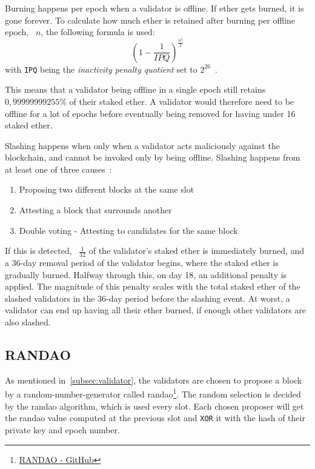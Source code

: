 Burning happens per epoch when a validator is offline.
If ether gets burned, it is gone forever.
To calculate how much ether is retained after burning per offline epoch, ~$n$, the following formula is used:
\begin{equation}
    \left(1-\frac{1}{IPQ}\right)^\frac{n^2}{2}
    \label{eq:burn}
\end{equation}
with \texttt{IPQ} being the \textit{inactivity penalty quotient} set to $2^{26}$~\cite{consensus-spec-phase-0}.


This means that a validator being offline in a single epoch still retains $0,99999999255\%$ of their staked ether\@.
A validator would therefore need
to be offline for a lot of epochs before eventually being removed for having under 16 staked ether\@.


Slashing happens when only when a validator acts maliciously against the blockchain,
and cannot be invoked only by being offline.
Slashing happens from at least one of three causes~\cite{PoSRewAndPen}:
\begin{enumerate}
    \item Proposing two different blocks at the same slot
    \item Attesting a block that surrounds another
    \item Double voting - Attesting to candidates for the same block
\end{enumerate}
If this is detected, ~$\frac{1}{32}$ of the validator's staked ether is immediately burned,
and a 36-day removal period of the validator begins, where the staked ether is gradually burned.
Halfway through this, on day 18, an additional penalty is applied.
The magnitude of this penalty scales with the total staked ether of the slashed validators in the 36-day period before the slashing event.
At worst, a validator can end up having all their ether burned, if enough other validators are also slashed.

\subsection{RANDAO}\label{subsec:randao}
As mentioned in~\autoref{subsec:validator}, the validators are chosen to propose a block by a random-number-generator called \gls{randao}\footnote{\href{https://github.com/randao/randao}{RANDAO - GitHub}}.
The random selection is decided by the \gls{randao} algorithm, which is used every slot.
Each chosen proposer will get the \gls{randao} value computed at the previous slot and \texttt{XOR} it with the hash of their private key and epoch number.


